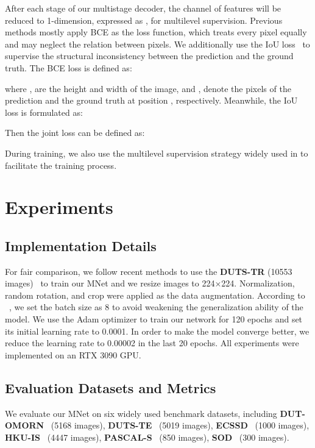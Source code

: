 \documentclass[lettersize,journal]{IEEEtran}
\begin{document}
After each stage of our multistage decoder, the channel of features will be reduced to 1-dimension, expressed as , for multilevel supervision. Previous methods mostly apply BCE as the loss function, which treats every pixel equally and may neglect the relation between pixels. We additionally use the IoU loss~\cite{BASNet,8237634} to supervise the structural inconsistency between the prediction and the ground truth. The BCE loss is defined as:

where ,  are the height and width of the image, and ,  denote the pixels of the prediction and the ground truth at position , respectively. Meanwhile, the IoU loss is formulated as:

Then the joint loss can be defined as:

During training, we also use the multilevel supervision strategy widely used in \cite{PoolNet,MiNet,F3Net,GCPANet,VST} to facilitate the training process. 




\section{Experiments}

\subsection{Implementation Details}
For fair comparison, we follow recent methods to use the \textbf{DUTS-TR} (10553 images)~\cite{DUTS} to train our MNet and we resize images to 224×224. Normalization, random  rotation, and crop were applied as the data augmentation. According to ~\cite{BigBatchsize}, we set the batch size as 8 to avoid weakening the generalization ability of the model. We use the Adam optimizer to train our network for 120 epochs and set its initial learning rate to 0.0001. In order to make the model converge better, we reduce the learning rate to 0.00002 in the last 20 epochs. All experiments were implemented on an RTX 3090 GPU.
\subsection{Evaluation Datasets and Metrics}

We evaluate our MNet on six widely used benchmark datasets, including \textbf{DUT-OMORN}~\cite{DUT-O} (5168 images), \textbf{DUTS-TE}~\cite{DUTS} (5019 images), \textbf{ECSSD}~\cite{ECSSD} (1000 images), \textbf{HKU-IS}~\cite{HKU-IS} (4447 images), \textbf{PASCAL-S}~\cite{PASCAL-S} (850 images), \textbf{SOD}~\cite{SOD} (300 images). 
\end{document}
